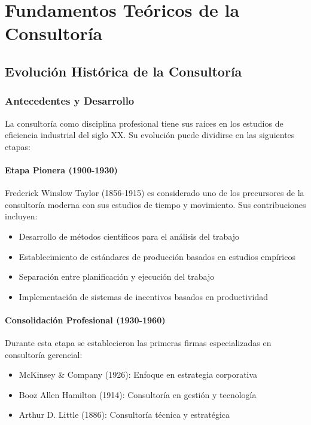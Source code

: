 \documentclass[12pt,letterpaper,oneside]{book}
\begin{document}
\chapter{Fundamentos Teóricos de la Consultoría}

\section{Evolución Histórica de la Consultoría}

\subsection{Antecedentes y Desarrollo}

La consultoría como disciplina profesional tiene sus raíces en los estudios de eficiencia industrial del siglo XX. Su evolución puede dividirse en las siguientes etapas:

\subsubsection{Etapa Pionera (1900-1930)}

Frederick Winslow Taylor (1856-1915) es considerado uno de los precursores de la consultoría moderna con sus estudios de tiempo y movimiento. Sus contribuciones incluyen:

\begin{itemize}
\item Desarrollo de métodos científicos para el análisis del trabajo
\item Establecimiento de estándares de producción basados en estudios empíricos
\item Separación entre planificación y ejecución del trabajo
\item Implementación de sistemas de incentivos basados en productividad
\end{itemize}

\subsubsection{Consolidación Profesional (1930-1960)}

Durante esta etapa se establecieron las primeras firmas especializadas en consultoría gerencial:

\begin{itemize}
\item McKinsey \& Company (1926): Enfoque en estrategia corporativa
\item Booz Allen Hamilton (1914): Consultoría en gestión y tecnología
\item Arthur D. Little (1886): Consultoría técnica y estratégica
\end{itemize}
\end{document}
